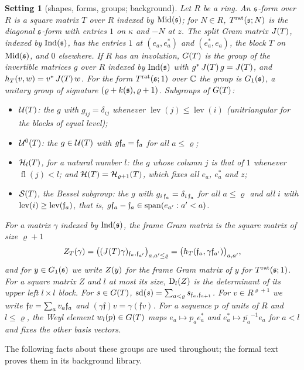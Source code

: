 \documentclass[11pt,a4paper]{article}
\theoremstyle{plainx}
\theoremstyle{uprightx}
\newtheorem{setting}[theorem]{Setting}          %
\newcommand{\cj}[1]{\overline{#1}}                  %
\newcommand{\adj}[1]{#1^{*}}                        %
\newcommand{\fl}{\operatorname{fl}}
\newcommand{\lev}{\operatorname{lev}}
\newcommand{\Sp}{\operatorname{span}}
\begin{document}
\begin{setting}[shapes, forms, groups; background]
Let $R$ be a ring. An \emph{$\mathfrak{s}$-form} over $R$ is a square matrix $T$ over $R$ indexed by $\operatorname{Mid}(\mathfrak{s})$; for $N\in R$,
$T^{\mathrm{rat}}(\mathfrak{s};N)$ is the diagonal $\mathfrak{s}$-form with entries $1$ on $\kappa$ and $-N$ at $z$. The \emph{split Gram matrix}
$J(T)$, indexed by $\operatorname{Ind}(\mathfrak{s})$, has the entries $1$ at $(e_a,e_a^*)$ and $(e_a^*,e_a)$, the block $T$ on $\operatorname{Mid}(\mathfrak{s})$,
and $0$ elsewhere. If $R$ has an involution, $G(T)$ is the group of the invertible matrices $g$ over $R$ indexed by
$\operatorname{Ind}(\mathfrak{s})$ with $\adj{g}\,\JT{T}\,g=\JT{T}$, and $h_T(v,w)=\adj{v}\,\JT{T}\,w$. For the form $T^{\mathrm{rat}}(\mathfrak{s};1)$ over $\mathbb{C}$ the
group is $G_{1}(\mathfrak{s})$, a unitary group of signature $(\varrho+k(\mathfrak{s}),\varrho+1)$. Subgroups of $G(T)$:
\begin{itemize}
\item $\mathcal{U}(T)$: the $g$ with $g_{ij}=\delta_{ij}$ whenever $\lev(j)\le\lev(i)$ (unitriangular for the blocks of equal
level);
\item $\mathcal{U}^{0}(T)$: the $g\in\mathcal{U}(T)$ with $g\mathfrak{f}_{a}=\mathfrak{f}_{a}$ for all $a\le\varrho$;
\item $\mathcal{H}_{l}(T)$, for a natural number $l$: the $g$ whose column $j$ is that of $1$ whenever $\fl(j)<l$; and
$\mathcal{H}(T)=\mathcal{H}_{\varrho+1}(T)$, which fixes all $e_a$, $e_a^*$ and $z$;
\item $\mathcal{S}(T)$, the \emph{Bessel subgroup}: the $g$ with $g_{i\,\mathfrak{f}_{a}}=\delta_{i\,\mathfrak{f}_{a}}$ for all $a\le\varrho$ and
all $i$ with $\lev(i)\ge\lev(\fr{a})$, that is, $g\fr{a}-\fr{a}\in\Sp(e_{a'}:a'<a)$.
\end{itemize}
For a matrix $\gamma$ indexed by $\operatorname{Ind}(\mathfrak{s})$, the \emph{frame Gram matrix} is the square matrix of size $\varrho+1$
\[Z_{T}(\gamma)=\bigl((J(T)\gamma)_{\mathfrak{f}_{a},\mathfrak{f}_{a'}}\bigr)_{a,a'\le\varrho}=\bigl(h_T(\mathfrak{f}_{a},\gamma\mathfrak{f}_{a'})\bigr)_{a,a'},\]
and for $y\in G_{1}(\mathfrak{s})$ we write $Z(y)$ for the frame Gram matrix of $y$ for $T^{\mathrm{rat}}(\mathfrak{s};1)$. For a square matrix
$Z$ and $l$ at most its size, $\mathrm{D}_{l}(Z)$ is the determinant of its upper left $l\times l$ block. For
$s\in G(T)$, $\operatorname{sd}(s)=\sum_{a<\varrho}s_{\mathfrak{f}_{a},\mathfrak{f}_{a+1}}$. For $v\in R^{\varrho+1}$ we write $\mathfrak f v=\sum_av_a\mathfrak{f}_{a}$
and $(\gamma\mathfrak f)v=\gamma(\mathfrak fv)$. For a sequence $p$ of units of $R$ and $l\le\varrho$, the \emph{Weyl
element} $w_{l}(p)\in G(T)$ maps $e_a\mapsto p_a e_a^*$ and $e_a^*\mapsto\cj{p_a}^{-1}e_a$ for $a<l$ and fixes the
other basis vectors.
\end{setting}

The following facts about these groups are used throughout; the formal text proves them in its background library.
\end{document}
